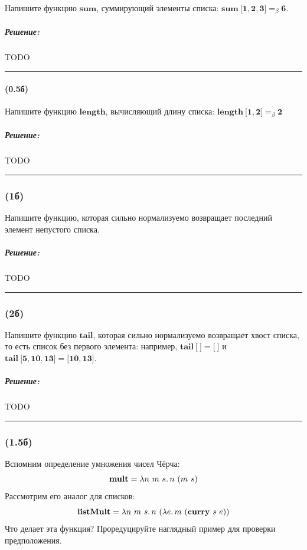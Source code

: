 \documentclass{article}
\newenvironment{proof}{\subparagraph{\hspace{-1em}Решение:\newline}}{\par\noindent\rule{\textwidth}{0.4pt}}
\newcommand{\term}[1]{\mathbf{#1}}
\newcommand{\ap}{~}
\newcommand{\eqbeta}{=_\beta}
\newcommand{\tlist}[1]{\term{[}#1\term{]}} %
\begin{document}
    Напишите функцию $\term{sum}$, суммирующий элементы списка: $\term{sum} \ap \tlist{\term{1}, \term{2}, \term{3}} \eqbeta \term{6}$.

    \begin{proof}
        TODO %
    \end{proof}

    \paragraph{(0.5б)}

    Напишите функцию $\term{length}$, вычисляющий длину списка: $\term{length} \ap \tlist{\term{1}, \term{2}} \eqbeta \term{2}$

    \begin{proof}
        TODO %
    \end{proof}

    \subsubsection{(1б)}

    Напишите функцию, которая сильно нормализуемо возвращает последний элемент непустого списка.

    \begin{proof}
        TODO %
    \end{proof}

    \subsubsection{(2б)}

    Напишите функцию $\term{tail}$, которая сильно нормализуемо возвращает хвост списка, то есть список без первого элемента: например, $\term{tail}~\tlist{~} = \tlist{~}$ и $\term{tail}~\tlist{\term{5},\term{10},\term{13}} = \tlist{\term{10}, \term{13}}$.

    \begin{proof}
        TODO %
    \end{proof}

    \subsubsection{(1.5б)}

    Вспомним определение умножения чисел Чёрча:
    \[\term{mult} = \lambda n~m~s\ldotp n~(m~s)\]
    Рассмотрим его аналог для списков:
    \[\term{listMult} = \lambda n~m~s\ldotp n~(\lambda e\ldotp m~(\term{curry}~s~e))\]
    Что делает эта функция?
    Проредуцируйте наглядный пример для проверки предположения.
\end{document}
